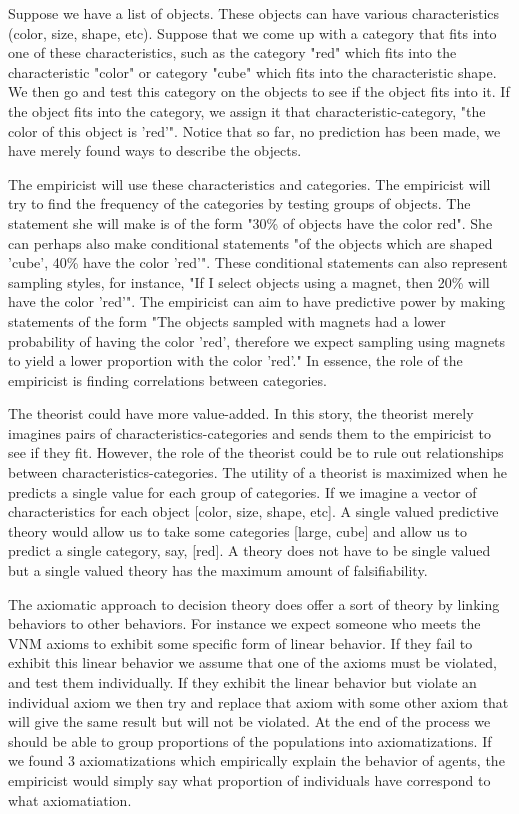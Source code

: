 \documentclass[11pt]{article}
\numberwithin{equation}{section}
\begin{document}
Suppose we have a list of objects. These objects can have various characteristics (color, size, shape, etc). Suppose that we come up with a category that fits into one of these characteristics, such as the category "red" which fits into the characteristic "color" or category "cube" which fits into the characteristic shape. We then go and test this category on the objects to see if the object fits into it. If the object fits into the category, we assign it that characteristic-category, "the color of this object is 'red'". Notice that so far, no prediction has been made, we have merely found ways to describe the objects. 

The empiricist will use these characteristics and categories. The empiricist will try to find the frequency of the categories by testing groups of objects. The statement she will make is of the form "30\% of objects have the color red". She can perhaps also make conditional statements "of the objects which are shaped 'cube', 40\% have the color 'red'". These conditional statements can also represent sampling styles, for instance, "If I select objects using a magnet, then 20\% will have the color 'red'". The empiricist can aim to have predictive power by making statements of the form "The objects sampled with magnets had a lower probability of having the color 'red', therefore we expect sampling using magnets to yield a lower proportion with the color 'red'." In essence, the role of the empiricist is finding correlations between categories.

The theorist could have more value-added. In this story, the theorist merely imagines pairs of characteristics-categories and sends them to the empiricist to see if they fit. However, the role of the theorist could be to rule out relationships between characteristics-categories. The utility of a theorist is maximized when he predicts a single value for each group of categories. If we imagine a vector of characteristics for each object [color, size, shape, etc]. A single valued predictive theory would allow us to take some categories [large, cube] and allow us to predict a single category, say, [red]. A theory does not have to be single valued but a single valued theory has the maximum amount of falsifiability. 

The axiomatic approach to decision theory does offer a sort of theory by linking behaviors to other behaviors. For instance we expect someone who meets the VNM axioms to exhibit some specific form of linear behavior. If they fail to exhibit this linear behavior we assume that one of the axioms must be violated, and test them individually. If they exhibit the linear behavior but violate an individual axiom we then try and replace that axiom with some other axiom that will give the same result but will not be violated. At the end of the process we should be able to group proportions of the populations into axiomatizations. If we found 3 axiomatizations which empirically explain the behavior of agents, the empiricist would simply say what proportion of individuals have correspond to what axiomatiation. 
\end{document}
